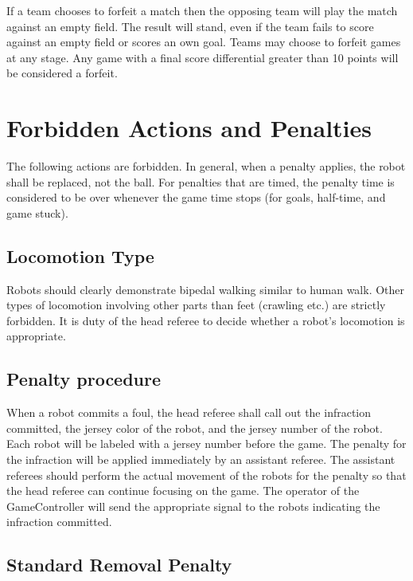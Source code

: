 \documentclass[12pt]{article}
\begin{document}
If a team chooses to forfeit a match then the opposing team will play the match against an empty field. The result will stand, even if the team fails to score against an empty field or scores an own goal. Teams may choose to forfeit games at any stage. Any game with a final score differential greater than 10 points will be considered a forfeit.

\section{Forbidden Actions and Penalties}
\label{sec:forbidden_act}

The following actions are forbidden. In general, when a penalty applies, the robot shall be replaced, not the ball. For penalties that are timed, the penalty time is considered to be over whenever the game time stops (for goals, half-time, and game stuck).

\subsection{Locomotion Type}
\label{sec:locomotion_type}

Robots should clearly demonstrate bipedal walking similar to human walk. Other types of locomotion involving other parts than feet (crawling etc.) are strictly forbidden. It is duty of the head referee to decide whether a robot's locomotion is appropriate.

\subsection{Penalty procedure}
\label{sec:penalty_procedure}

When a robot commits a foul, the head referee shall call out the infraction committed, the jersey color of the robot, and the jersey number of the robot. Each robot will be labeled with a jersey number before the game. The penalty for the infraction will be applied immediately by an assistant referee. The assistant referees should perform the actual movement of the robots for the penalty so that the head referee can continue focusing on the game. The operator of the GameController will send the appropriate signal to the robots indicating the infraction committed.

\subsection{Standard Removal Penalty}
\label{sec:removal_penalty}
\end{document}

